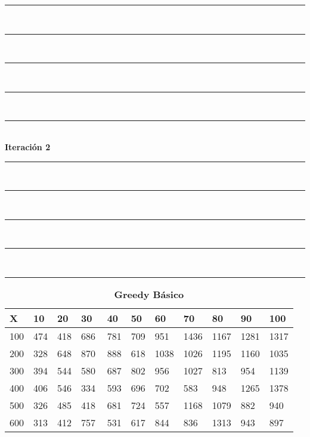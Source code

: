 \documentclass[10pt,letterpaper]{article}
\begin{document}
\newpage 
\begin{center}
\newcommand{\HRule}{\rule{\linewidth}{0.5mm}}
\center
\HRule\\[6cm]
\HRule\\[0.4cm]
\HRule\\[0.4cm]
\HRule\\[0.4cm]
\HRule\\[0.4cm]
{\centering \Huge\bfseries Iteración 2}\\[0.4cm]
\HRule\\[0.4cm]
\HRule\\[0.4cm]
\HRule\\[0.4cm]
\HRule\\[6cm]
\HRule
\end{center}
\newpage 
{}
\begin{center}
\begin{table}\renewcommand{\arraystretch}{2.5}
\caption{\large \textbf{Greedy Básico}}
\centering
\begin{tabular} { |m{0.5cm}|m{1.3cm}|m{1.3cm}|m{1.3cm}|m{1.3cm}|m{1.3cm}|m{1.3cm}|m{1.3cm}|m{1.3cm}|m{1.3cm}|m{1.3cm}|} 
\hline
\rowcolor{Gray}
\centering \textbf{X} & \centering \textbf{10} & \centering \textbf{20} & \centering \textbf{30}\ & \centering \textbf{40} & \centering \textbf{50} & \centering \textbf{60}\ & \centering \textbf{70} & \centering \textbf{80} & \centering \textbf{90}\ & \textbf{100} \\\hline
\cellcolor{Gray}100 & \Large 474 & \Large 418 & \Large 686 & \Large 781 & \Large 709 & \Large 951 & \Large 1436 & \Large 1167 & \Large 1281 & \Large 1317 \\
\hline
\cellcolor{Gray}200 & \Large 328 & \Large 648 & \Large 870 & \Large 888 & \Large 618 & \Large 1038 & \Large 1026 & \Large 1195 & \Large 1160 & \Large 1035 \\
\hline
\cellcolor{Gray}300 & \Large 394 & \Large 544 & \Large 580 & \Large 687 & \Large 802 & \Large 956 & \Large 1027 & \Large 813 & \Large 954 & \Large 1139 \\
\hline
\cellcolor{Gray}400 & \Large 406 & \Large 546 & \Large 334 & \Large 593 & \Large 696 & \Large 702 & \Large 583 & \Large 948 & \Large 1265 & \Large 1378 \\
\hline
\cellcolor{Gray}500 & \Large 326 & \Large 485 & \Large 418 & \Large 681 & \Large 724 & \Large 557 & \Large 1168 & \Large 1079 & \Large 882 & \Large 940 \\
\hline
\cellcolor{Gray}600 & \Large 313 & \Large 412 & \Large 757 & \Large 531 & \Large 617 & \Large 844 & \Large 836 & \Large 1313 & \Large 943 & \Large 897 \\

\end{tabular}
\end{table}
\end{center}
\end{document}
